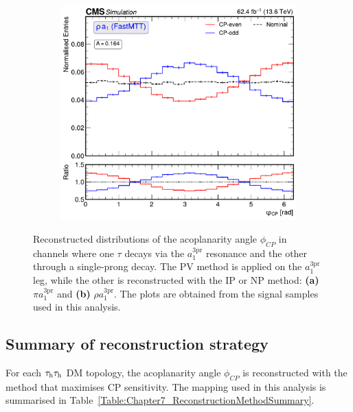 \begin{figure}[!htbp]
\begin{subfigure}[b]{0.49\textwidth}
            \includegraphics[width=\textwidth]{Figures/Chapter7/Acoplanarity/With_IP/aco_rho_a1_FASTMTT_MassConstraint.pdf}
            \caption{}
        \end{subfigure}
    \caption[Reconstructed $\phi_{CP}$ distributions with the combined IP/NP--PV method.]
    {Reconstructed distributions of the acoplanarity angle $\phi_{CP}$ in channels where one $\tau$ decays via the $a_1^{3\mathrm{pr}}$ resonance and the other through a single-prong decay. The \ac{PV} method is applied on the $a_1^{3\mathrm{pr}}$ leg, while the other is reconstructed with the \ac{IP} or \ac{NP} method: \textbf{(a)} $\pi a_1^{3\mathrm{pr}}$ and \textbf{(b)} $\rho a_1^{3\mathrm{pr}}$. The plots are obtained from the signal samples used in this analysis.}
    \label{Figure:CPDist_Combined_IPNP_PV}
\end{figure}

\subsection{Summary of reconstruction strategy}
\label{Section:Chapter7_MethodSummary}

For each $\tau_\mathrm{h}\tau_\mathrm{h}$ DM topology, the acoplanarity angle $\phi_{CP}$ is reconstructed with the method that maximises CP sensitivity. The mapping used in this analysis is summarised in Table~\ref{Table:Chapter7_ReconstructionMethodSummary}.

